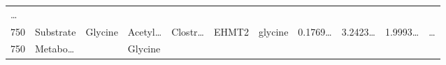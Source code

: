 \documentclass[
]{article}
\begin{document}
\begin{longtable}[]{@{}lllllllllll@{}}
\begin{minipage}[t]{0.03\columnwidth}
\ldots{}\strut
\end{minipage}\tabularnewline
\begin{minipage}[t]{0.03\columnwidth}\raggedright
750\strut
\end{minipage} & \begin{minipage}[t]{0.07\columnwidth}\raggedright
Substrate\strut
\end{minipage} & \begin{minipage}[t]{0.07\columnwidth}\raggedright
Glycine\strut
\end{minipage} & \begin{minipage}[t]{0.09\columnwidth}\raggedright
Acetyl\ldots{}\strut
\end{minipage} & \begin{minipage}[t]{0.07\columnwidth}\raggedright
Clostr\ldots{}\strut
\end{minipage} & \begin{minipage}[t]{0.07\columnwidth}\raggedright
EHMT2\strut
\end{minipage} & \begin{minipage}[t]{0.09\columnwidth}\raggedright
glycine\strut
\end{minipage} & \begin{minipage}[t]{0.07\columnwidth}\raggedright
0.1769\ldots{}\strut
\end{minipage} & \begin{minipage}[t]{0.07\columnwidth}\raggedright
3.2423\ldots{}\strut
\end{minipage} & \begin{minipage}[t]{0.07\columnwidth}\raggedright
1.9993\ldots{}\strut
\end{minipage} & \begin{minipage}[t]{0.03\columnwidth}\raggedright
\ldots{}\strut
\end{minipage}\tabularnewline
\begin{minipage}[t]{0.03\columnwidth}\raggedright
750\strut
\end{minipage} & \begin{minipage}[t]{0.07\columnwidth}\raggedright
Metabo\ldots{}\strut
\end{minipage} & \begin{minipage}[t]{0.07\columnwidth}\raggedright
\strut
\end{minipage} & \begin{minipage}[t]{0.09\columnwidth}\raggedright
Glycine\strut
\end{minipage} & \begin{minipage}[t]{0.07\columnwidth}\raggedright

\end{minipage}
\end{longtable}
\end{document}
